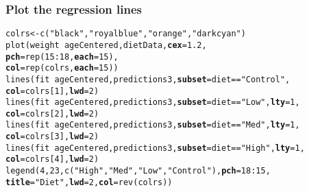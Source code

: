 \documentclass[color=usenames,dvipsnames]{beamer}\usepackage[]{graphicx}\usepackage[]{color}
\makeatletter
\newcommand{\hlnum}[1]{\textcolor[rgb]{0.69,0.494,0}{#1}}%
\newcommand{\hlstr}[1]{\textcolor[rgb]{0.749,0.012,0.012}{#1}}%
\newcommand{\hlopt}[1]{\textcolor[rgb]{0,0,0}{#1}}%
\newcommand{\hlstd}[1]{\textcolor[rgb]{0,0,0}{#1}}%
\newcommand{\hlkwb}[1]{\textcolor[rgb]{0,0.341,0.682}{#1}}%
\newcommand{\hlkwc}[1]{\textcolor[rgb]{0,0,0}{\textbf{#1}}}%
\newcommand{\hlkwd}[1]{\textcolor[rgb]{0.004,0.004,0.506}{#1}}%
\newenvironment{kframe}{%
 \def\at@end@of@kframe{}%
 \ifinner\ifhmode%
  \def\at@end@of@kframe{\end{minipage}}%
  \begin{minipage}{\columnwidth}%
 \fi\fi%
 \def\FrameCommand##1{\hskip\@totalleftmargin \hskip-\fboxsep
 \colorbox{shadecolor}{##1}\hskip-\fboxsep
     \hskip-\linewidth \hskip-\@totalleftmargin \hskip\columnwidth}%
 \MakeFramed {\advance\hsize-\width
   \@totalleftmargin\z@ \linewidth\hsize
   \@setminipage}}%
 {\par\unskip\endMakeFramed%
 \at@end@of@kframe}
\newenvironment{knitrout}{}{} %
\makeatother
\begin{document}
\begin{frame}[fragile]
  \frametitle{Plot the regression lines}
\footnotesize %

\begin{knitrout}\footnotesize
{}\color{fgcolor}\begin{kframe}
\begin{alltt}
\hlstd{colrs} \hlkwb{<-} \hlkwd{c}\hlstd{(}\hlstr{"black"}\hlstd{,} \hlstr{"royalblue"}\hlstd{,} \hlstr{"orange"}\hlstd{,} \hlstr{"darkcyan"}\hlstd{)}
\hlkwd{plot}\hlstd{(weight} \hlopt{~} \hlstd{ageCentered, dietData,} \hlkwc{cex}\hlstd{=}\hlnum{1.2}\hlstd{,}
     \hlkwc{pch}\hlstd{=}\hlkwd{rep}\hlstd{(}\hlnum{15}\hlopt{:}\hlnum{18}\hlstd{,} \hlkwc{each}\hlstd{=}\hlnum{15}\hlstd{),}
     \hlkwc{col}\hlstd{=}\hlkwd{rep}\hlstd{(colrs,} \hlkwc{each}\hlstd{=}\hlnum{15}\hlstd{))}
\hlkwd{lines}\hlstd{(fit} \hlopt{~} \hlstd{ageCentered, predictions3,} \hlkwc{subset}\hlstd{=diet}\hlopt{==}\hlstr{"Control"}\hlstd{,}
      \hlkwc{col}\hlstd{=colrs[}\hlnum{1}\hlstd{],} \hlkwc{lwd}\hlstd{=}\hlnum{2}\hlstd{)}
\hlkwd{lines}\hlstd{(fit} \hlopt{~} \hlstd{ageCentered, predictions3,} \hlkwc{subset}\hlstd{=diet}\hlopt{==}\hlstr{"Low"}\hlstd{,} \hlkwc{lty}\hlstd{=}\hlnum{1}\hlstd{,}
      \hlkwc{col}\hlstd{=colrs[}\hlnum{2}\hlstd{],} \hlkwc{lwd}\hlstd{=}\hlnum{2}\hlstd{)}
\hlkwd{lines}\hlstd{(fit} \hlopt{~} \hlstd{ageCentered, predictions3,} \hlkwc{subset}\hlstd{=diet}\hlopt{==}\hlstr{"Med"}\hlstd{,} \hlkwc{lty}\hlstd{=}\hlnum{1}\hlstd{,}
      \hlkwc{col}\hlstd{=colrs[}\hlnum{3}\hlstd{],} \hlkwc{lwd}\hlstd{=}\hlnum{2}\hlstd{)}
\hlkwd{lines}\hlstd{(fit} \hlopt{~} \hlstd{ageCentered, predictions3,} \hlkwc{subset}\hlstd{=diet}\hlopt{==}\hlstr{"High"}\hlstd{,} \hlkwc{lty}\hlstd{=}\hlnum{1}\hlstd{,}
      \hlkwc{col}\hlstd{=colrs[}\hlnum{4}\hlstd{],} \hlkwc{lwd}\hlstd{=}\hlnum{2}\hlstd{)}
\hlkwd{legend}\hlstd{(}\hlnum{4}\hlstd{,} \hlnum{23}\hlstd{,} \hlkwd{c}\hlstd{(}\hlstr{"High"}\hlstd{,} \hlstr{"Med"}\hlstd{,} \hlstr{"Low"}\hlstd{,} \hlstr{"Control"}\hlstd{),} \hlkwc{pch}\hlstd{=}\hlnum{18}\hlopt{:}\hlnum{15}\hlstd{,}
       \hlkwc{title}\hlstd{=}\hlstr{"Diet"}\hlstd{,} \hlkwc{lwd}\hlstd{=}\hlnum{2}\hlstd{,} \hlkwc{col}\hlstd{=}\hlkwd{rev}\hlstd{(colrs))}
\end{alltt}
\end{kframe}
\end{knitrout}
\end{frame}
\end{document}
